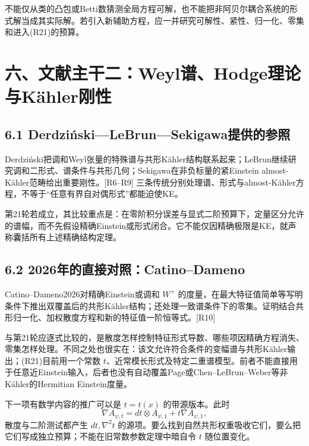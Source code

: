 \documentclass[
  11pt,
  a4paper,
  fontset=none]{ctexart}
\begin{document}
不能仅从类的凸包或Betti数猜测全局方程可解，也不能把非阿贝尔耦合系统的形式解当成其实际解。若引入新辅助方程，应一并研究可解性、紧性、归一化、零集和进入(R21)的预算。

\section{六、文献主干二：Weyl谱、Hodge理论与Kähler刚性}\label{ux516dux6587ux732eux4e3bux5e72ux4e8cweylux8c31hodgeux7406ux8bbaux4e0ekuxe4hlerux521aux6027}

\subsection{6.1
Derdziński---LeBrun---Sekigawa提供的参照}\label{derdziux144skilebrunsekigawaux63d0ux4f9bux7684ux53c2ux7167}

Derdziński把调和Weyl张量的特殊谱与共形Kähler结构联系起来；LeBrun继续研究调和二形式、谱条件与共形几何；Sekigawa在非负标量的紧Einstein
almost-Kähler范畴给出重要刚性。{[}R6--R9{]}
三条传统分别处理谱、形式与almost-Kähler方程，不等于``任意有界自对偶形式''都能迫使KE。

第21轮若成立，其比较重点是：在零阶积分误差与显式二阶预算下，定量区分允许的谱幅，而不先假设精确Einstein或形式闭合。它不能仅因精确极限是KE，就声称囊括所有上述精确结构定理。

\subsection{6.2
2026年的直接对照：Catino--Dameno}\label{ux5e74ux7684ux76f4ux63a5ux5bf9ux7167catinodameno}

Catino--Dameno2026对精确Einstein或调和 \(W^+\)
的度量，在最大特征值简单等写明条件下推出双覆盖后的共形Kähler结构；还处理一致谱条件下的零集。证明结合共形归一化、加权散度方程和新的特征值一阶恒等式。{[}R10{]}

与第21轮应逐式比较的，是散度怎样控制特征形式导数、哪些项因精确方程消失、零集怎样处理。不同之处也很实在：该文允许符合条件的变幅谱与共形Kähler输出；(R21)目前用一个常数
\(t\)、近常模长形式及特定二重谱模型。前者不能直接用于任意近Einstein输入，后者也没有自动覆盖Page或Chen--LeBrun--Weber等非Kähler的Hermitian
Einstein度量。

下一项有数学内容的推广可以是 \(t=t(x)\) 的带源版本。此时 \[
\nabla A_{\psi,t}=dt\otimes A_{\psi,1}+t\nabla A_{\psi,1},
\] 散度与二阶测试都产生 \(dt,\nabla^2t\)
的源项。要么找到自然共形权重吸收它们，要么把它们写成独立预算；不能在旧常数参数定理中暗自令
\(t\) 随位置变化。
\end{document}
